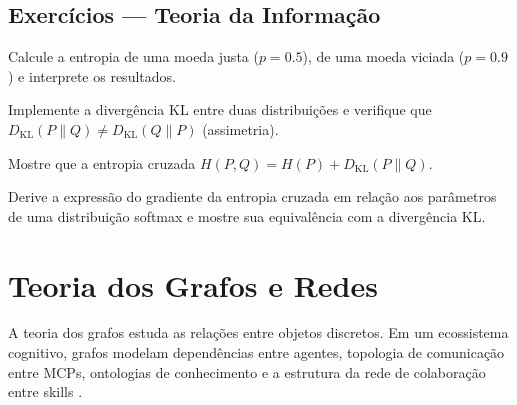\subsection{Exercícios — Teoria da Informação}
\begin{exercicio}
Calcule a entropia de uma moeda justa ($p = 0.5$), de uma moeda viciada
($p = 0.9$) e interprete os resultados.
\end{exercicio}
\begin{exercicio}
Implemente a divergência KL entre duas distribuições e verifique que
$D_{\text{KL}}(P \parallel Q) \neq D_{\text{KL}}(Q \parallel P)$
(assimetria).
\end{exercicio}
\begin{exercicio}
Mostre que a entropia cruzada $H(P, Q) = H(P) + D_{\text{KL}}(P \parallel
Q)$.
\end{exercicio}
\begin{exercicio}
Derive a expressão do gradiente da entropia cruzada em relação aos
parâmetros de uma distribuição softmax e mostre sua equivalência com a
divergência KL.
\end{exercicio}
\section{Teoria dos Grafos e Redes}
\label{sec:teoria-grafos}
\nivelavancado
A teoria dos grafos estuda as relações entre objetos discretos. Em um
ecossistema cognitivo, grafos modelam dependências entre agentes, topologia
de comunicação entre MCPs, ontologias de conhecimento e a estrutura da rede
de colaboração entre skills \cite{barabasi2016network,
wooldridge2009multiagent}.
